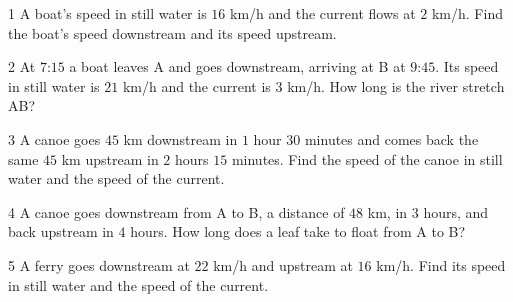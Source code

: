 \begin{probbox}{1}{\relax}
A boat's speed in still water is $16$ km/h and the current flows at $2$ km/h. Find the boat's speed downstream and its speed upstream.
\end{probbox}
\gap
\begin{probbox}{2}{\relax}
At $7$:$15$ a boat leaves A and goes downstream, arriving at B at $9$:$45$. Its speed in still water is $21$ km/h and the current is $3$ km/h. How long is the river stretch AB?
\end{probbox}
\gap
\begin{probbox}{3}{\relax}
A canoe goes $45$ km downstream in $1$ hour $30$ minutes and comes back the same $45$ km upstream in $2$ hours $15$ minutes. Find the speed of the canoe in still water and the speed of the current.
\end{probbox}
\gap
\begin{probbox}{4}{\relax}
A canoe goes downstream from A to B, a distance of $48$ km, in $3$ hours, and back upstream in $4$ hours. How long does a leaf take to float from A to B?
\end{probbox}
\gap
\begin{probbox}{5}{\relax}
A ferry goes downstream at $22$ km/h and upstream at $16$ km/h. Find its speed in still water and the speed of the current.
\end{probbox}
